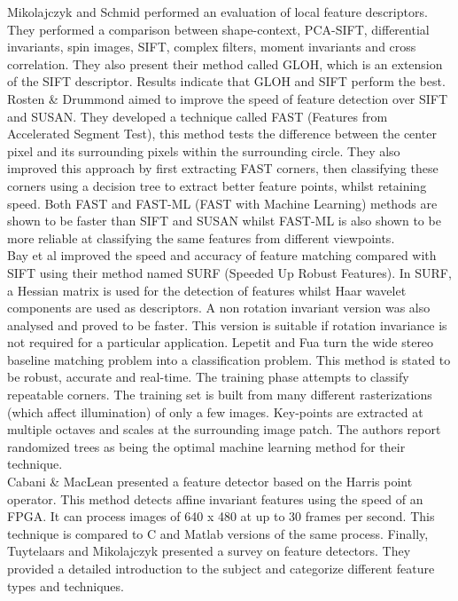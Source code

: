Mikolajczyk and Schmid \cite{Mikolajczyk05Performance} performed an evaluation of local feature descriptors. They performed a comparison between shape-context, PCA-SIFT, differential invariants, spin images, SIFT, complex filters, moment invariants and cross correlation. They also present their method called GLOH, which is an extension of the SIFT descriptor. Results indicate that GLOH and SIFT perform the best. Rosten \& Drummond \cite{Rosten06Machine,Rosten05Fusing} aimed to improve the speed of feature detection over SIFT and SUSAN. They developed a technique called FAST (Features from Accelerated Segment Test), this method tests the difference between the center pixel and its surrounding pixels within the surrounding circle. They also improved this approach by first extracting FAST corners, then classifying these corners using a decision tree to extract better feature points, whilst retaining speed. Both FAST and FAST-ML (FAST with Machine Learning) methods are shown to be faster than SIFT and SUSAN whilst FAST-ML is also shown to be more reliable at classifying the same features from different viewpoints.  \\ 


Bay et al \cite{Bay06Surf} improved the speed and accuracy of feature matching compared with SIFT using their method named SURF (Speeded Up Robust Features). In SURF, a Hessian matrix is used for the detection of features whilst Haar wavelet components are used as descriptors. A non rotation invariant version was also analysed and proved to be faster. This version is suitable if rotation invariance is not required for a particular application. Lepetit and Fua \cite{Lepetit06Keypoint} turn the wide stereo baseline matching problem into a classification problem. This method is stated to be robust, accurate and real-time. The training phase attempts to classify repeatable corners. The training set is built from many different rasterizations (which affect illumination) of only a few images. Key-points are extracted at multiple octaves and scales at the surrounding image patch. The authors report randomized trees as being the optimal machine learning method for their technique. \\


Cabani \& MacLean \cite{Cabani07Implementation} presented a feature detector based on the Harris point operator. This method detects affine invariant features using the speed of an FPGA. It can process images of 640 x 480 at up to 30 frames per second. This technique is compared to C and Matlab versions of the same process. Finally, Tuytelaars and Mikolajczyk \cite{Tuytelaars08Local} presented a survey on feature detectors. They provided a detailed introduction to the subject and categorize different feature types and techniques. \\


